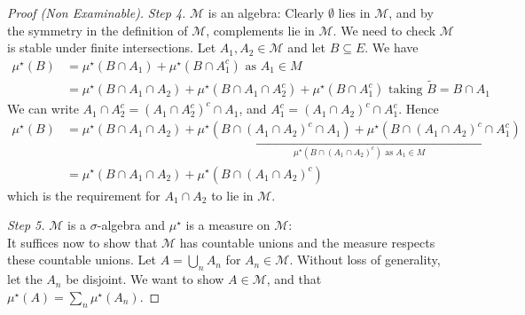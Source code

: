 \begin{proof}[Proof (Non Examinable)]
	\emph{Step 4.} $\mathcal M$ is an algebra:
	Clearly $\emptyset$ lies in $\mathcal M$, and by the symmetry in the definition of $\mathcal M$, complements lie in $\mathcal M$.
	We need to check $\mathcal M$ is stable under finite intersections.
	Let $A_1, A_2 \in \mathcal M$ and let $B \subseteq E$.
	We have
	\begin{align*}
		\mu^\star(B) &= \mu^\star(B \cap A_1) + \mu^\star(B \cap A_1^c) \text{ as $A_1 \in M$} \\
		&= \mu^\star(B \cap A_1 \cap A_2) + \mu^\star(B \cap A_1 \cap A_2^c) + \mu^\star(B \cap A_1^c) \text{ taking $\tilde{B} = B \cap A_1$}
	\end{align*}
	We can write $A_1 \cap A_2^c = (A_1 \cap A_2^c)^c \cap A_1$, and $A_1^c = (A_1 \cap A_2)^c \cap A_1^c$.
	Hence
	\begin{align*}
		\mu^\star(B) &= \mu^\star(B \cap A_1 \cap A_2) + \underbracket{\mu^\star(B \cap (A_1 \cap A_2)^c \cap A_1) + \mu^\star(B \cap (A_1 \cap A_2)^c \cap A_1^c)}_{\mu^\star(B \cap (A_1 \cap A_2)^c) \text{ as } A_1 \in M} \\
		&= \mu^\star(B \cap A_1 \cap A_2) + \mu^\star(B \cap (A_1 \cap A_2)^c)
	\end{align*}
	which is the requirement for $A_1 \cap A_2$ to lie in $\mathcal M$.

	\emph{Step 5.} $\mathcal M$ is a $\sigma$-algebra and $\mu^\star$ is a measure on $\mathcal M$: \\
	It suffices now to show that $\mathcal M$ has countable unions and the measure respects these countable unions.
	Let $A = \bigcup_n A_n$ for $A_n \in \mathcal M$.
	Without loss of generality, let the $A_n$ be disjoint.
	We want to show $A \in \mathcal M$, and that $\mu^\star(A) = \sum_n \mu^\star(A_n)$.


\end{proof}
